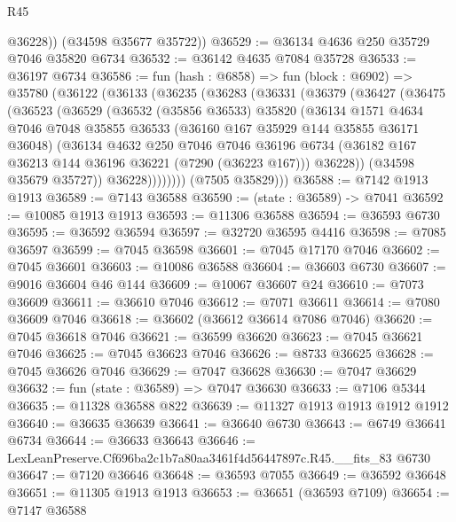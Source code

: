 \begin{lexlean}{R45}
\begin{coremodule}
{          @36228))
      (@34598 @35677 @35722))
@36529 := @36134 @4636 @250 @35729 @7046 @35820 @6734
@36532 := @36142 @4635 @7084 @35728
@36533 := @36197 @6734
@36586 := fun (hash : @6858) =>
  fun (block : @6902) =>
  @35780
    (@36122
      (@36133
        (@36235
          (@36283
            (@36331
              (@36379
                (@36427
                  (@36475
                    (@36523
                      (@36529
                        (@36532
                          (@35856 @36533)
                          @35820
                          (@36134
                            @1571
                            @4634
                            @7046
                            @7048
                            @35855
                            @36533
                            (@36160 @167 @35929 @144 @35855 @36171 @36048)
                            (@36134
                              @4632
                              @250
                              @7046
                              @7046
                              @36196
                              @6734
                              (@36182 @167 @36213 @144 @36196 @36221 (@7290 (@36223 @167)))
                              @36228))
                          (@34598 @35679 @35727))
                        @36228))))))))
        (@7505 @35829)))
@36588 := @7142 @1913 @1913
@36589 := @7143 @36588
@36590 := (state : @36589) -> @7041
@36592 := @10085 @1913 @1913
@36593 := @11306 @36588
@36594 := @36593 @6730
@36595 := @36592 @36594
@36597 := @32720 @36595 @4416
@36598 := @7085 @36597
@36599 := @7045 @36598
@36601 := @7045 @17170 @7046
@36602 := @7045 @36601
@36603 := @10086 @36588
@36604 := @36603 @6730
@36607 := @9016 @36604 @46 @144
@36609 := @10067 @36607 @24
@36610 := @7073 @36609
@36611 := @36610 @7046
@36612 := @7071 @36611
@36614 := @7080 @36609 @7046
@36618 := @36602 (@36612 @36614 @7086 @7046)
@36620 := @7045 @36618 @7046
@36621 := @36599 @36620
@36623 := @7045 @36621 @7046
@36625 := @7045 @36623 @7046
@36626 := @8733 @36625
@36628 := @7045 @36626 @7046
@36629 := @7047 @36628
@36630 := @7047 @36629
@36632 := fun (state : @36589) => @7047 @36630
@36633 := @7106 @5344
@36635 := @11328 @36588 @822
@36639 := @11327 @1913 @1913 @1912 @1912
@36640 := @36635 @36639
@36641 := @36640 @6730
@36643 := @6749 @36641 @6734
@36644 := @36633 @36643
@36646 := LexLeanPreserve.Cf696ba2c1b7a80aa3461f4d56447897c.R45.__fits_83 @6730
@36647 := @7120 @36646
@36648 := @36593 @7055
@36649 := @36592 @36648
@36651 := @11305 @1913 @1913
@36653 := @36651 (@36593 @7109)
@36654 := @7147 @36588
}
\end{coremodule}
\end{lexlean}
